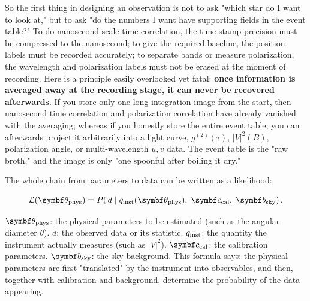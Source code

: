 So the first thing in designing an observation is not to ask "which star do I want to look at," but to ask "do the numbers I want have supporting fields in the event table?" To do nanosecond-scale time correlation, the time-stamp precision must be compressed to the nanosecond; to give the required baseline, the position labels must be recorded accurately; to separate bands or measure polarization, the wavelength and polarization labels must not be erased at the moment of recording. Here is a principle easily overlooked yet fatal: \textbf{once information is averaged away at the recording stage, it can never be recovered afterwards}. If you store only one long-integration image from the start, then nanosecond time correlation and polarization correlation have already vanished with the averaging; whereas if you honestly store the entire event table, you can afterwards project it arbitrarily into a light curve, $g^{(2)}(\tau)$, $|V|^2(B)$, polarization angle, or multi-wavelength $u,v$ data. The event table is the "raw broth," and the image is only "one spoonful after boiling it dry."

The whole chain from parameters to data can be written as a likelihood:

\begin{equation}
  \mathcal L(\bm\theta_{\rm phys})
  =
  P\!\left(\,d \;\middle|\;
  q_{\rm inst}(\bm\theta_{\rm phys}),\;
  \bm c_{\rm cal},\;
  \bm b_{\rm sky}
  \right).
  \label{eq:e15-likelihood}
\end{equation}
\begin{formulaexplain}
$\bm\theta_{\rm phys}$: the physical parameters to be estimated (such as the angular diameter $\theta$). $d$: the observed data or its statistic. $q_{\rm inst}$: the quantity the instrument actually measures (such as $|V|^2$). $\bm c_{\rm cal}$: the calibration parameters. $\bm b_{\rm sky}$: the sky background. This formula says: the physical parameters are first "translated" by the instrument into observables, and then, together with calibration and background, determine the probability of the data appearing.
\end{formulaexplain}


